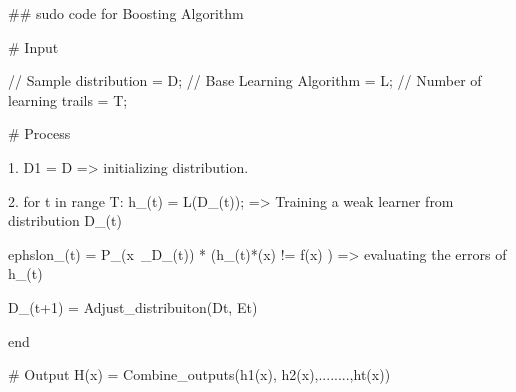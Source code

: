 ## sudo code for Boosting Algorithm

# Input 

// Sample distribution = D;
// Base Learning Algorithm = L;
// Number of learning trails  = T;

# Process

1. D1 = D    => initializing distribution.

2.  for t in range T:
        h_(t) = L(D_(t));    => Training a weak learner from distribution D_(t)

        ephslon_(t) = P_(x~_D_(t)) * (h_(t)*(x) != f(x) )  => evaluating the errors of h_(t)

        D_(t+1) = Adjust_distribuiton(Dt, Et)


    end   

# Output H(x) = Combine_outputs({h1(x), h2(x),........,ht(x)}) 

